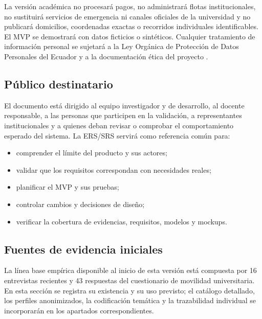 \documentclass[12pt,a4paper]{article}
\begin{document}
La versión académica no procesará pagos, no administrará flotas institucionales, no sustituirá servicios de emergencia ni canales oficiales de la universidad y no publicará domicilios, coordenadas exactas o recorridos individuales identificables. El MVP se demostrará con datos ficticios o sintéticos. Cualquier tratamiento de información personal se sujetará a la Ley Orgánica de Protección de Datos Personales del Ecuador y a la documentación ética del proyecto \cite{lopdp2021}.

\subsection{Público destinatario}

El documento está dirigido al equipo investigador y de desarrollo, al docente responsable, a las personas que participen en la validación, a representantes institucionales y a quienes deban revisar o comprobar el comportamiento esperado del sistema. La ERS/SRS servirá como referencia común para:

\begin{itemize}
  \item comprender el límite del producto y sus actores;
  \item validar que los requisitos correspondan con necesidades reales;
  \item planificar el MVP y sus pruebas;
  \item controlar cambios y decisiones de diseño;
  \item verificar la cobertura de evidencias, requisitos, modelos y mockups.
\end{itemize}

\subsection{Fuentes de evidencia iniciales}

La línea base empírica disponible al inicio de esta versión está compuesta por 16 entrevistas recientes y 43 respuestas del cuestionario de movilidad universitaria. En esta sección se registra su existencia y su uso previsto; el catálogo detallado, los perfiles anonimizados, la codificación temática y la trazabilidad individual se incorporarán en los apartados correspondientes.
\end{document}
